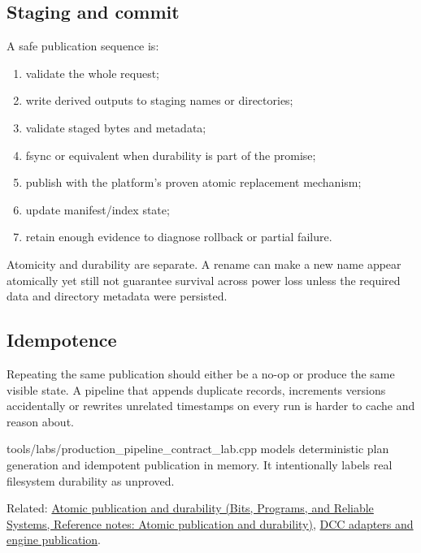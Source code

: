 \subsection{Staging and commit}\label{appendix-91eaa3cbdbc3-staging-and-commit}

\hypertarget{appendix-91eaa3cbdbc3-staging-and-commit}{}

A safe publication sequence is:

\begin{enumerate}
\def\labelenumi{\arabic{enumi}.}
\tightlist
\item
  validate the whole request;
\item
  write derived outputs to staging names or directories;
\item
  validate staged bytes and metadata;
\item
  fsync or equivalent when durability is part of the promise;
\item
  publish with the platform's proven atomic replacement mechanism;
\item
  update manifest/index state;
\item
  retain enough evidence to diagnose rollback or partial failure.
\end{enumerate}

Atomicity and durability are separate. A rename can make a new name appear atomically yet still not guarantee survival across power loss unless the required data and directory metadata were persisted.

\subsection{Idempotence}\label{appendix-91eaa3cbdbc3-idempotence}

\hypertarget{appendix-91eaa3cbdbc3-idempotence}{}

Repeating the same publication should either be a no-op or produce the same visible state. A pipeline that appends duplicate records, increments versions accidentally or rewrites unrelated timestamps on every run is harder to cache and reason about.

tools/labs/production\_pipeline\_contract\_lab.cpp models deterministic plan generation and idempotent publication in memory. It intentionally labels real filesystem durability as unproved.

Related: \href{../01-Bits-Programs-and-Reliable-Systems/main.pdf\#nameddest=appendix-e89a8f290ef5}{Atomic publication and durability (Bits, Programs, and Reliable Systems, Reference notes: Atomic publication and durability)}, \hyperref[appendix-03ade9e1875f]{DCC adapters and engine publication}.
